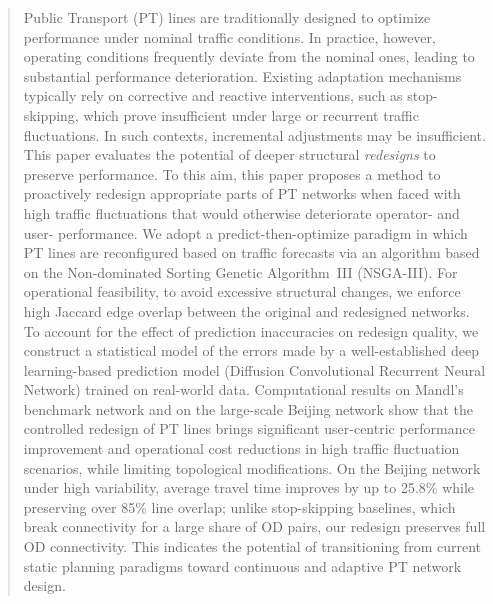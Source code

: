 \documentclass[a4paper,fleqn]{cas-sc}
\begin{document}

\begin{abstract}
Public Transport (PT) lines are traditionally designed to optimize performance under nominal traffic conditions. In practice, however, operating conditions frequently deviate from the nominal ones, leading to substantial performance deterioration. Existing adaptation mechanisms typically rely on corrective and reactive interventions, such as stop-skipping, which prove insufficient under large or recurrent traffic fluctuations. In such contexts, incremental adjustments may be insufficient. This paper evaluates the potential of deeper structural \emph{redesigns} to preserve performance.
%
To this aim, this paper proposes a method to proactively redesign appropriate parts of PT networks when faced with high traffic fluctuations that would otherwise deteriorate operator- and user- performance. We adopt a predict-then-optimize paradigm in which PT lines are reconfigured based on traffic forecasts via an algorithm based on the Non-dominated Sorting Genetic Algorithm~III (NSGA-III).
%
For operational feasibility, to avoid excessive structural changes, we enforce high Jaccard edge overlap between the original and redesigned networks. To account for the effect of prediction inaccuracies on redesign quality, we construct a statistical model of the errors made by a well-established deep learning-based prediction model (Diffusion Convolutional Recurrent Neural Network) trained on real-world data.
%
Computational results on Mandl's benchmark network and on the large-scale Beijing network show that the controlled redesign of PT lines brings significant user-centric performance improvement and operational cost reductions in high traffic fluctuation scenarios, while limiting topological modifications. 
On the Beijing network under high variability, average travel time improves by up to 25.8\% while preserving over 85\% line overlap; unlike stop-skipping baselines, which break connectivity for a large share of OD pairs, our redesign preserves full OD connectivity.
%
This indicates the potential of transitioning from current static planning paradigms toward continuous and adaptive PT network design.
\end{abstract}

\end{document}
